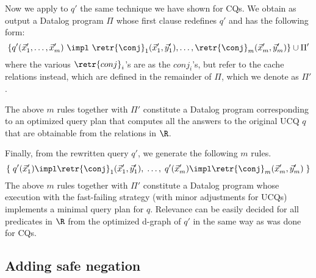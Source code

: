 Now we apply to $q'$ the same technique we have shown for CQs.
We obtain as output a Datalog program $\Pi$
whose first clause redefines $q'$ and has the following form:
%
\[
    \{q'(\vec x'_{1},\ldots,\vec x'_m) ~\impl~
    \retr{\conj}_{1}(\vec x'_1,\vec y'_1),
    \ldots,
    \retr{\conj}_{m}(\vec x'_m,\vec y'_m)\} \cup \Pi'
\]
where the various ${\retr{conj}_{i}}$'s are as the ${conj_{i}}$'s, but refer to
the cache relations instead, which are defined in the remainder of $\Pi$, which
we denote as $\Pi'$.

The above $m$ rules together with $\Pi'$ constitute a Datalog program
corresponding to an optimized query plan that computes all the answers to the
original UCQ $q$ that are obtainable from the relations in $\R$.

Finally, from the rewritten query $q'$, we generate the following $m$ rules.
%
$$
    \{\;  q'(\vec x'_{1}) \impl
    \retr{\conj}_{1}(\vec x'_1,\vec y'_1),
      \;\ldots,\;
      q'(\vec x'_m) \impl
    \retr{\conj}_{m}(\vec x'_m,\vec y'_m) \;\}
$$
The above $m$ rules together with $\Pi'$ constitute a Datalog program whose execution with the fast-failing strategy (with minor adjustments for UCQs) implements a 
minimal query plan for $q$.
Relevance can be easily decided for all predicates in $\R$ from the optimized d-graph of $q'$ in the same way as was done for CQs. 


\subsection{Adding safe negation}\label{sec:negation}

